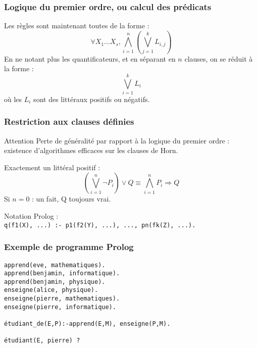 \documentclass[aspectratio=43]{beamer}
\begin{document}
\begin{frame}
\frametitle{Logique du premier ordre, ou calcul des prédicats}
  Les règles sont maintenant toutes de la forme :
  $$\forall X_{1}...X_{s},\bigwedge_{i=1}^{n}\left(\bigvee_{j=1}^{k}L_{i,j}\right)$$
  En ne notant plus les quantificateurs, et en séparant en $n$ clauses, on se réduit à la forme :
  $$\bigvee_{i=1}^{k}L_{i}$$ où les $L_{i}$ sont des littéraux positifs ou négatifs.
\end{frame}

\begin{frame}
  \frametitle{Restriction aux clauses définies}
  \begin{alertblock}{Attention}
    Perte de généralité par rapport à la logique du premier ordre : existence d'algorithmes efficaces sur les clauses de Horn.
  \end{alertblock}

  Exactement un littéral positif :
  $$\left(\bigvee_{i=1}^{n}\neg P_{i}\right)\vee{Q} \equiv \bigwedge_{i=1}^{n}P_{i}\Rightarrow Q$$
  Si $n=0$ : un fait, Q toujours vrai.

  \vspace{1em}

  Notation Prolog :\\
  \texttt{q(f1(X), ...) :- p1(f2(Y), ...), ..., pn(fk(Z), ...).}
\end{frame}


\begin{frame}[fragile]
  \frametitle{Exemple de programme Prolog}
\begin{Verbatim}
apprend(eve, mathematiques).
apprend(benjamin, informatique).
apprend(benjamin, physique).
enseigne(alice, physique).
enseigne(pierre, mathematiques).
enseigne(pierre, informatique).

étudiant_de(E,P):-apprend(E,M), enseigne(P,M).

étudiant(E, pierre) ?
\end{Verbatim}
\end{frame}
\end{document}
